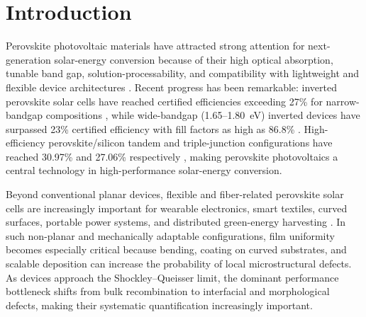 \documentclass[pdflatex,sn-mathphys-num,iicol]{sn-jnl}
\theoremstyle{thmstyleone}
\theoremstyle{thmstyletwo}
\theoremstyle{thmstylethree}
\begin{document}

\section{Introduction}\label{sec:introduction}

Perovskite photovoltaic materials have attracted strong attention for
next-generation solar-energy conversion because of their high optical
absorption, tunable band gap, solution-processability, and
compatibility with lightweight and flexible device architectures
\cite{kojima2009,snaith2013,green2014,park2015}.
Recent progress has been remarkable: inverted perovskite solar cells
have reached certified efficiencies exceeding 27\% for narrow-bandgap
compositions \cite{green2025}, while wide-bandgap (1.65--1.80~eV)
inverted devices have surpassed 23\% certified efficiency with fill
factors as high as 86.8\% \cite{chang2026}. High-efficiency
perovskite/silicon tandem and triple-junction configurations have
reached 30.97\% and 27.06\% respectively
\cite{chang2026,zheng2025}, making perovskite photovoltaics a
central technology in high-performance solar-energy conversion.

Beyond conventional planar devices, flexible and fiber-related
perovskite solar cells are increasingly important for wearable
electronics, smart textiles, curved surfaces, portable power systems,
and distributed green-energy harvesting
\cite{balilonda2019,hu2016,qiu2016,diGiacomo2016}.
In such non-planar and mechanically adaptable configurations, film
uniformity becomes especially critical because bending, coating on
curved substrates, and scalable deposition can increase the
probability of local microstructural defects. As devices approach
the Shockley--Queisser limit, the dominant performance bottleneck
shifts from bulk recombination to interfacial and morphological
defects, making their systematic quantification increasingly
important.
\end{document}
